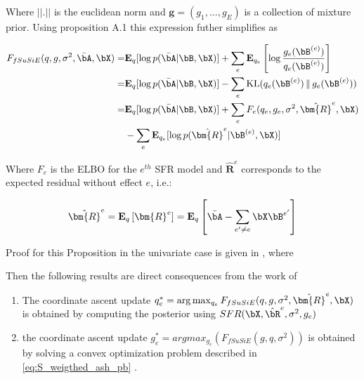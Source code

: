 Where $||.||$ is the euclidean norm and $\bm{g}=(g_1,...,g_E)$ is a collection of mixture  prior. Using proposition A.1\cite{wang_simple_2020} this expression futher simplifies as 


\begin{align}
    F_{fSuSiE}(q,g, \sigma^2,\bar{\bA},\bX) = &\mathbf{E}_q[\log p(\bar{\bA}|\bB, \bX)]+ \sum_e  \mathbf{E}_{q_e}\left[\log \frac{g_e(\bB^{(e)}) }{q_e(\bB^{(e)})}\right]\\
    =  &\mathbf{E}_q[\log p(\bar{\bA}|\bB, \bX)] - \sum_e \operatorname{KL}(q_e(\bB^{(e)})\,\|\,g_e(\bB^{(e)}))\\
     =&\mathbf{E}_q[\log p(\bar{\bA}|\bB, \bX)]+ \sum_e F_e(q_e,g_e, \sigma^2,\hat{\bm{R}}^e,\bX)\\
     &-\sum_e \mathbf{E}_{q_e} [\log p( \hat{\bm{R}}^e |\bB^{(e)}, \bX) ]
\end{align}

Where $F_e$ is the ELBO for the $e^{th}$ SFR model and  $\hat{\bm{R}}^e$ corresponds to the expected residual without effect $e$, i.e.:


 

\begin{align}\label{eq:expected_residuals}
\hat{\bm{R}}^e =  \mathbf{E}_q \left[\bm{R}^e\right] =  \mathbf{E}_q \left[\bar{\bA} - \sum_{e' \neq e} \bX \bB^{e'}      \right] \end{align}

Proof for this Proposition   in the univariate case is given in \cite{wang_simple_2020}, where



Then the following results are direct consequences from the work of \cite{wang_simple_2020} 

\begin{enumerate}
    \item The coordinate ascent update $q^*_e = \arg\max_{q_{e}}F_{fSuSiE}(q,g,\sigma^2,\hat{\bm{R}}^e,\bX)$ is obtained by computing the posterior using $SFR(\bX,\hat{\bR}^e,\sigma^2,g_e)$
    \item  the coordinate ascent update 
    $ g_e^* = argmax_{g_e}(F_{fSuSiE}( g,q,\sigma^2)) $
    is obtained by solving a convex optimization problem described in \ref{eq:S_weigthed_ash_pb} .


\end{enumerate}

 


